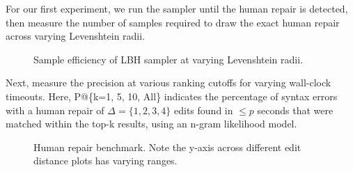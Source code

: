 For our first experiment, we run the sampler until the human repair is detected, then measure the number of samples required to draw the exact human repair across varying Levenshtein radii.

\begin{figure}[h!]
%  
  \caption{Sample efficiency of LBH sampler at varying Levenshtein radii.}\label{fig:sample_efficiency}
\end{figure}

Next, measure the precision at various ranking cutoffs for varying wall-clock timeouts. Here, P@\{k=1, 5, 10, All\} indicates the percentage of syntax errors with a human repair of $\Delta=\{1, 2, 3, 4\}$ edits found in $\leq p$ seconds that were matched within the top-k results, using an n-gram likelihood model.

\begin{figure}[h!]
  \resizebox{.24\textwidth}{!}{}
  \resizebox{.24\textwidth}{!}{}
  \resizebox{.24\textwidth}{!}{}
  \resizebox{.24\textwidth}{!}{}
  \caption{Human repair benchmark. Note the y-axis across different edit distance plots has varying ranges.}\label{fig:human}
\end{figure}